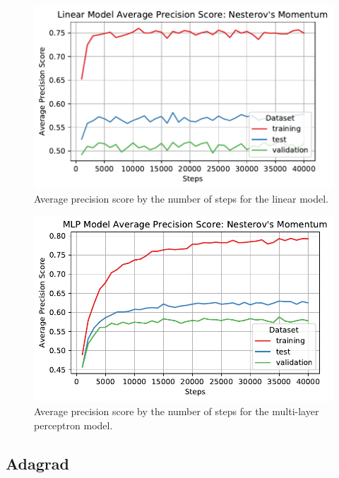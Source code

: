 \documentclass[letterpaper,11pt]{article}
\begin{document}
  \begin{figure}
    \centering
    \includegraphics{problem4/linear_average_precision_score_nesterov.pdf}
    \caption{Average precision score by the number of steps for the linear
      model.}
    \label{fig:linear_average_precision_score_nesterov}
  \end{figure}
  
  \begin{figure}
    \centering
    \includegraphics{problem4/mlp_average_precision_score_nesterov.pdf}
    \caption{Average precision score by the number of steps for the multi-layer
      perceptron model.}
    \label{fig:mlp_average_precision_score_nesterov}
  \end{figure}

\subsection*{Adagrad}
\end{document}
